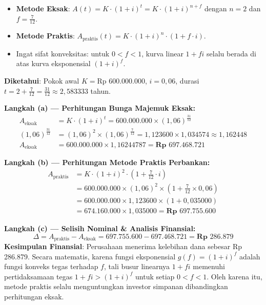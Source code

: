 \documentclass[11pt,a4paper]{article}
\begin{document}
\begin{petunjukbox}
\begin{itemize}[leftmargin=4mm, topsep=1pt, itemsep=1pt]
    \item \textbf{Metode Eksak}: $A(t) = K \cdot (1+i)^t = K \cdot (1+i)^{n+f}$ dengan $n=2$ dan $f = \frac{7}{12}$.
    \item \textbf{Metode Praktis}: $A_{\text{praktis}}(t) = K \cdot (1+i)^n \cdot (1 + f \cdot i)$.
    \item Ingat sifat konveksitas: untuk $0 < f < 1$, kurva linear $1+fi$ selalu berada di atas kurva eksponensial $(1+i)^f$.
\end{itemize}
\end{petunjukbox}

\begin{solusibox}
\textbf{Diketahui}: Pokok awal $K = \text{Rp } 600.000.000$, $i = 0{,}06$, durasi $t = 2 + \frac{7}{12} = \frac{31}{12} \approx 2{,}583333$ tahun.

\textbf{Langkah (a) --- Perhitungan Bunga Majemuk Eksak:}
\begin{align*}
    A_{\text{eksak}} &= K \cdot (1 + i)^t = 600.000.000 \times (1{,}06)^{\frac{31}{12}} \\
    (1{,}06)^{\frac{31}{12}} &= (1{,}06)^2 \times (1{,}06)^{\frac{7}{12}} = 1{,}123600 \times 1{,}034574 \approx 1{,}162448 \\
    A_{\text{eksak}} &= 600.000.000 \times 1{,}16244787 = \mathbf{\text{Rp } 697.468.721}
\end{align*}

\textbf{Langkah (b) --- Perhitungan Metode Praktis Perbankan:}
\begin{align*}
    A_{\text{praktis}} &= K \cdot (1 + i)^2 \cdot \left(1 + \frac{7}{12} \cdot i\right) \\
    &= 600.000.000 \times (1{,}06)^2 \times \left(1 + \frac{7}{12} \times 0{,}06\right) \\
    &= 600.000.000 \times 1{,}123600 \times (1 + 0{,}035000) \\
    &= 674.160.000 \times 1{,}035000 = \mathbf{\text{Rp } 697.755.600}
\end{align*}

\textbf{Langkah (c) --- Selisih Nominal \& Analisis Finansial:}
$$\Delta = A_{\text{praktis}} - A_{\text{eksak}} = 697.755.600 - 697.468.721 = \mathbf{\text{Rp } 286.879}$$
\textbf{Kesimpulan Finansial}: Perusahaan menerima kelebihan dana sebesar Rp 286.879. Secara matematis, karena fungsi eksponensial $g(f) = (1+i)^f$ adalah fungsi konveks tegas terhadap $f$, tali busur linearnya $1 + fi$ memenuhi pertidaksamaan tegas $1 + fi > (1+i)^f$ untuk setiap $0 < f < 1$. Oleh karena itu, metode praktis selalu menguntungkan investor simpanan dibandingkan perhitungan eksak.
\end{solusibox}
\end{document}
